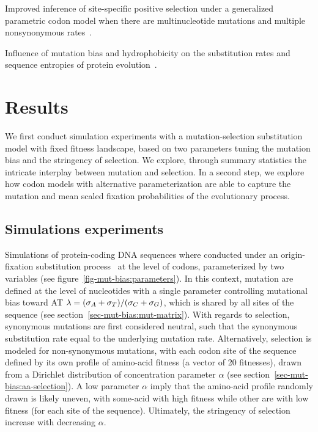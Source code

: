 Improved inference of site-specific positive selection under a generalized parametric codon model when there are multinucleotide mutations and multiple nonsynonymous rates~\citep{Dunn2019}.

Influence of mutation bias and hydrophobicity on the substitution rates and sequence entropies of protein evolution~\citep{Santos2018}.

\section{Results}

We first conduct simulation experiments with a mutation-selection substitution model with fixed fitness landscape, based on two parameters tuning the mutation bias and the stringency of selection.
We explore, through summary statistics the intricate interplay between mutation and selection.
In a second step, we explore how codon models with alternative parameterization are able to capture the mutation and mean scaled fixation probabilities of the evolutionary process.

\subsection{Simulations experiments}

Simulations of protein-coding DNA sequences where conducted under an origin-fixation substitution process~\citep{McCandlish2014} at the level of codons, parameterized by two variables (see figure~\ref{fig-mut-bias:parameters}).
In this context, mutation are defined at the level of nucleotides with a single parameter controlling mutational bias toward AT $\lambda = (\sigma_A+\sigma_T)/(\sigma_C+\sigma_G)$, which is shared by all sites of the sequence (see section~\ref{sec-mut-bias:mut-matrix}).
With regards to selection, synonymous mutations are first considered neutral, such that the synonymous substitution rate equal to the underlying mutation rate.
Alternatively, selection is modeled for non-synonymous mutations, with each codon site of the sequence defined by its own profile of amino-acid fitness (a vector of 20 fitnesses), drawn from a Dirichlet distribution of concentration parameter $\alpha$ (see section~\ref{sec-mut-bias:aa-selection}).
A low parameter $\alpha$ imply that the amino-acid profile randomly drawn is likely uneven, with some-acid with high fitness while other are with low fitness (for each site of the sequence).
Ultimately, the stringency of selection increase with decreasing $\alpha$.

